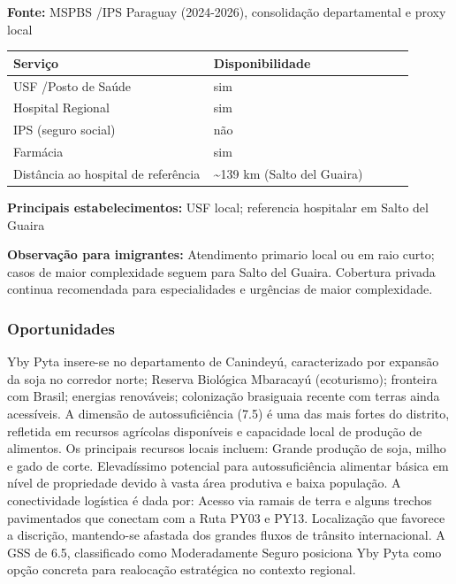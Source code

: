 \textbf{Fonte:} MSPBS /\allowbreak  IPS Paraguay (2024-2026), consolidação
departamental e proxy local

{\def\LTcaptype{none} %
\begin{longtable}{@{}>{\raggedright\arraybackslash}p{0.45\linewidth} >{\raggedright\arraybackslash}p{0.45\linewidth}@{}}
\toprule\noalign{}
Serviço & Disponibilidade \\
\midrule\noalign{}
\endhead
\bottomrule\noalign{}
\endlastfoot
USF /\allowbreak  Posto de Saúde & sim \\
Hospital Regional & sim \\
IPS (seguro social) & não \\
Farmácia & sim \\
Distância ao hospital de referência & \textasciitilde139 km (Salto del
Guaira) \\
\end{longtable}
}

\textbf{Principais estabelecimentos:} USF local; referencia hospitalar
em Salto del Guaira

\textbf{Observação para imigrantes:} Atendimento primario local ou em
raio curto; casos de maior complexidade seguem para Salto del Guaira.
Cobertura privada continua recomendada para especialidades e urgências
de maior complexidade.
\newpage

\subsubsection*{Oportunidades}\label{oport-yby-pyta-1413}
Yby Pyta insere-se no departamento de Canindeyú, caracterizado por expansão da soja no corredor norte; Reserva Biológica Mbaracayú (ecoturismo); fronteira com Brasil; energias renováveis; colonização brasiguaia recente com terras ainda acessíveis. A dimensão de autossuficiência (7.5) é uma das mais fortes do distrito, refletida em recursos agrícolas disponíveis e capacidade local de produção de alimentos. Os principais recursos locais incluem: Grande produção de soja, milho e gado de corte. Elevadíssimo potencial para autossuficiência alimentar básica em nível de propriedade devido à vasta área produtiva e baixa população. A conectividade logística é dada por: Acesso via ramais de terra e alguns trechos pavimentados que conectam com a Ruta PY03 e PY13. Localização que favorece a discrição, mantendo-se afastada dos grandes fluxos de trânsito internacional. A GSS de 6.5, classificado como Moderadamente Seguro posiciona Yby Pyta como opção concreta para realocação estratégica no contexto regional.

